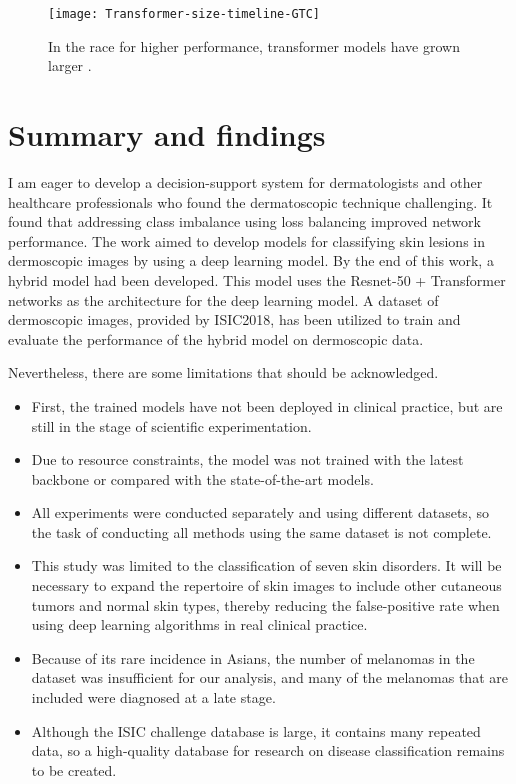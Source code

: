 \begin{figure}
\centerline{
 \texttt{[image: Transformer-size-timeline-GTC]} 
 }
\caption{In the race for higher performance, transformer models have grown larger \cite{whattran}.}
\label{Fig:GTC}
\end{figure}

\section{Summary and findings}

I am eager to develop a decision-support system for dermatologists and other healthcare professionals who found the dermatoscopic technique challenging. It found that addressing class imbalance using loss balancing improved network performance. The work aimed to develop models for classifying skin lesions in dermoscopic images by using a deep learning model. By the end of this work, a hybrid model had been developed. This model uses the Resnet-50 + Transformer networks as the architecture for the deep learning model. A dataset of dermoscopic
images, provided by ISIC2018, has been utilized to train and evaluate the performance of the hybrid model on dermoscopic data. 

Nevertheless, there are some limitations that should be acknowledged.
\begin{itemize} \label{sec.lim}
    \item First, the trained models have not been deployed in clinical practice, but are still in the stage of scientific experimentation.
    \item Due to resource constraints, the model was not trained with the latest backbone or compared with the state-of-the-art models.
    \item All experiments were conducted separately and using different datasets, so the task of conducting all methods using the same dataset is not complete.
    \item This study was limited to the classification of seven skin disorders. It will be necessary to expand the repertoire of skin images to include other cutaneous tumors and normal skin types,  thereby reducing the false-positive rate when using deep learning algorithms in real clinical practice.
    \item Because of its rare incidence in Asians, the number of melanomas in the dataset was insufficient for our analysis, and many of the melanomas that are included were diagnosed at a late stage.
    \item Although the ISIC challenge database is large, it contains many repeated data, so a high-quality database for research on disease classification remains to be created.
\end{itemize}